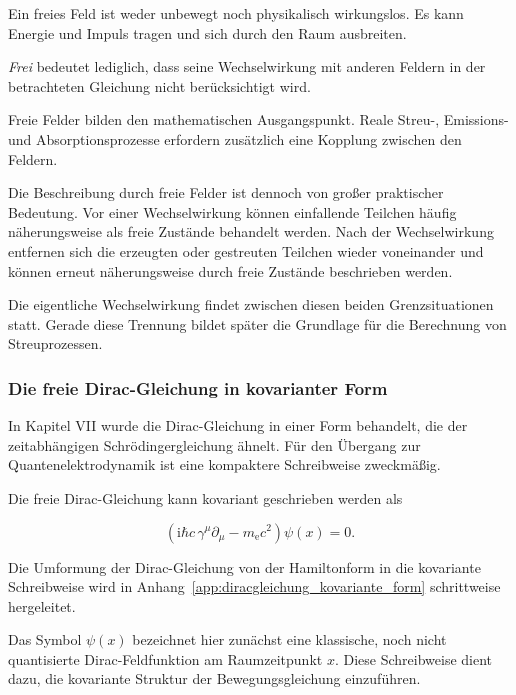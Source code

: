 \begin{DidacticBox}
	\label{box:freies_feld_ohne_wechselwirkung}

	Ein freies Feld ist weder unbewegt noch physikalisch wirkungslos.
	Es kann Energie und Impuls tragen und sich durch den Raum ausbreiten.

	\emph{Frei} bedeutet lediglich, dass seine Wechselwirkung mit anderen
	Feldern in der betrachteten Gleichung nicht berücksichtigt wird.

	Freie Felder bilden den mathematischen Ausgangspunkt. Reale
	Streu-, Emissions- und Absorptionsprozesse erfordern zusätzlich eine
	Kopplung zwischen den Feldern.
\end{DidacticBox}

Die Beschreibung durch freie Felder ist dennoch von großer praktischer
Bedeutung.
Vor einer Wechselwirkung können einfallende Teilchen häufig
näherungsweise als freie Zustände behandelt werden.
Nach der Wechselwirkung entfernen sich die erzeugten oder gestreuten
Teilchen wieder voneinander und können erneut näherungsweise durch freie
Zustände beschrieben werden.

Die eigentliche Wechselwirkung findet zwischen diesen beiden
Grenzsituationen statt.
Gerade diese Trennung bildet später die Grundlage für die Berechnung von
Streuprozessen.

\subsubsection*{Die freie Dirac-Gleichung in kovarianter Form}

In Kapitel VII wurde die Dirac-Gleichung in einer Form behandelt, die
der zeitabhängigen Schrödingergleichung ähnelt.
Für den Übergang zur Quantenelektrodynamik ist eine kompaktere
Schreibweise zweckmäßig.

Die freie Dirac-Gleichung kann
kovariant geschrieben werden als

\begin{equation}
	\left(
	\mathrm{i}\hbar c\,\gamma^\mu\partial_\mu
	-
	m_{\mathrm e}c^2
	\right)
	\psi(x)
	=
	0.
	\label{eq:kovariante_diracgleichung_qed}
\end{equation}

Die Umformung der Dirac-Gleichung von der Hamiltonform in die kovariante
Schreibweise wird in
Anhang~\ref{app:diracgleichung_kovariante_form} schrittweise hergeleitet.

Das Symbol \(\psi(x)\) bezeichnet hier zunächst eine klassische, noch
nicht quantisierte Dirac-Feldfunktion am Raumzeitpunkt \(x\).
Diese Schreibweise dient dazu, die kovariante Struktur der
Bewegungsgleichung einzuführen.

